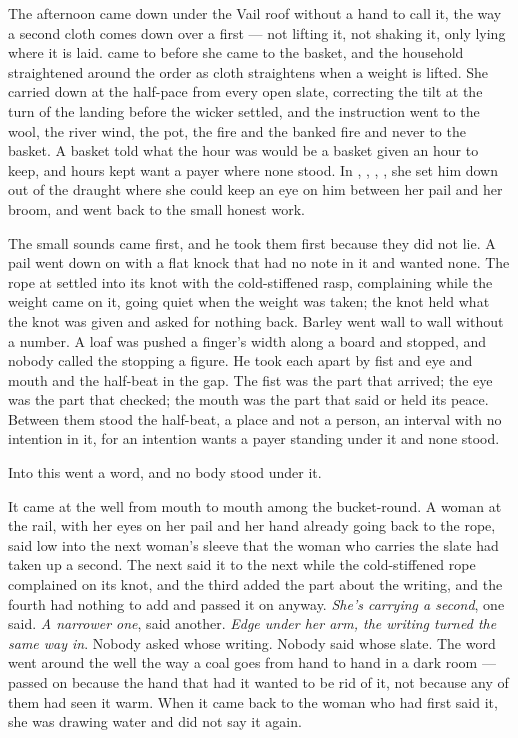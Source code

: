 The afternoon came down under the Vail roof without a hand to call it, the way a second cloth comes down over a first --- not lifting it, not shaking it, only lying where it is laid.  came to  before she came to the basket, and the household straightened around the order as cloth straightens when a weight is lifted. She carried  down  at the half-pace from every open slate, correcting the tilt at the turn of the landing before the wicker settled, and the instruction went to the wool, the river wind, the pot, the fire and the banked fire and never to the basket. A basket told what the hour was would be a basket given an hour to keep, and hours kept want a payer where none stood. In , , , , she set him down out of the draught where she could keep an eye on him between her pail and her broom, and went back to the small honest work.

The small sounds came first, and he took them first because they did not lie. A pail went down on  with a flat knock that had no note in it and wanted none. The rope at  settled into its knot with the cold-stiffened rasp, complaining while the weight came on it, going quiet when the weight was taken; the knot held what the knot was given and asked for nothing back. Barley went wall to wall without a number. A loaf was pushed a finger's width along a board and stopped, and nobody called the stopping a figure. He took each apart by fist and eye and mouth and the half-beat in the gap. The fist was the part that arrived; the eye was the part that checked; the mouth was the part that said or held its peace. Between them stood the half-beat, a place and not a person, an interval with no intention in it, for an intention wants a payer standing under it and none stood.

Into this went a word, and no body stood under it.

It came at the well from mouth to mouth among the bucket-round. A woman at the rail, with her eyes on her pail and her hand already going back to the rope, said low into the next woman's sleeve that the woman who carries the slate had taken up a second. The next said it to the next while the cold-stiffened rope complained on its knot, and the third added the part about the writing, and the fourth had nothing to add and passed it on anyway. \emph{She's carrying a second}, one said. \emph{A narrower one}, said another. \emph{Edge under her arm, the writing turned the same way in}. Nobody asked whose writing. Nobody said whose slate. The word went around the well the way a coal goes from hand to hand in a dark room --- passed on because the hand that had it wanted to be rid of it, not because any of them had seen it warm. When it came back to the woman who had first said it, she was drawing water and did not say it again.

